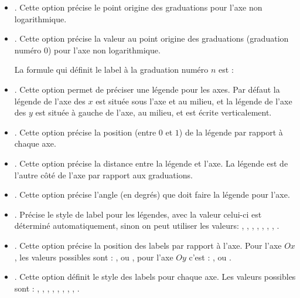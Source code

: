 \begin{itemize}
\begin{itemize}
        \item {}. Cette option précise le point origine des graduations pour l'axe non logarithmique.
        
        \item {}. Cette option précise la valeur au point origine des graduations (graduation numéro $0$) pour l'axe non logarithmique. 
        
        La formule qui définit le label à la graduation numéro $n$ est : 
        
        \item {}. Cette option permet de préciser une légende pour les axes. Par défaut la légende de l'axe des $x$ est située sous l'axe et au milieu, et la légende de l'axe des $y$ est située à gauche de l'axe, au milieu, et est écrite verticalement.
        
        \item {}. Cette option précise la position (entre $0$ et $1$) de la légende par rapport à chaque axe.
        
        \item {}. Cette option précise la distance entre la légende et l'axe. La légende est de l'autre côté de l'axe par rapport aux graduations.
        
        \item {}. Cette option précise l'angle (en degrés) que doit faire la légende pour l'axe. 
        
        \item {}. Précise le style de label pour les légendes, avec la valeur  celui-ci est déterminé automatiquement, sinon on peut utiliser les valeurs: , , , , , , , .
        
        \item {}. Cette option précise la position des labels par rapport à l'axe. Pour l'axe $Ox$, les valeurs possibles sont : ,  ou , pour l'axe $Oy$ c'est :  ,  ou .
        
        \item {}. Cette option définit le style des labels pour chaque axe. Les valeurs possibles sont : , , , , , , , , .
        

\end{itemize}
\end{itemize}
